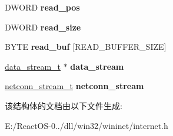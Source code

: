 \begin{DoxyCompactItemize}
D\+W\+O\+RD {\bfseries read\+\_\+pos}
\item 
\mbox{\label{structhttp__request__t_ae717b54f3efbf22fe273e90e15585c8e}} 
D\+W\+O\+RD {\bfseries read\+\_\+size}
\item 
\mbox{\label{structhttp__request__t_a7adbea351b1e58fd8bf0f51174fb738d}} 
B\+Y\+TE {\bfseries read\+\_\+buf} \mbox{[}R\+E\+A\+D\+\_\+\+B\+U\+F\+F\+E\+R\+\_\+\+S\+I\+ZE\mbox{]}
\item 
\mbox{\label{structhttp__request__t_a4b1ecbdc54fb99806ea9cc8ea2ce33b4}} 
\hyperlink{structdata__stream__t}{data\+\_\+stream\+\_\+t} $\ast$ {\bfseries data\+\_\+stream}
\item 
\mbox{\label{structhttp__request__t_a533710f7b7c6e1f367482e2c191a3b7a}} 
\hyperlink{structnetconn__stream__t}{netconn\+\_\+stream\+\_\+t} {\bfseries netconn\+\_\+stream}
\end{DoxyCompactItemize}


该结构体的文档由以下文件生成\+:\begin{DoxyCompactItemize}
\item 
E\+:/\+React\+O\+S-\/0../dll/win32/wininet/internet.\+h\end{DoxyCompactItemize}
